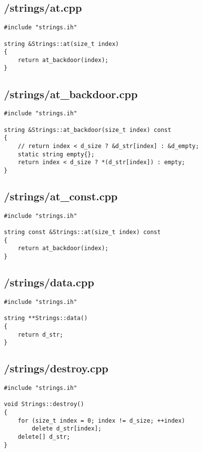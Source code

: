 \documentclass{article}
\begin{document}
\subsection*{/strings/at.cpp}
\begin{verbatim}
#include "strings.ih"

string &Strings::at(size_t index)
{
    return at_backdoor(index);
}
\end{verbatim}
\subsection*{/strings/at\_backdoor.cpp}
\begin{verbatim}
#include "strings.ih"

string &Strings::at_backdoor(size_t index) const
{
    // return index < d_size ? &d_str[index] : &d_empty;
    static string empty{};
    return index < d_size ? *(d_str[index]) : empty; 
}

\end{verbatim}
\subsection*{/strings/at\_const.cpp}
\begin{verbatim}
#include "strings.ih"

string const &Strings::at(size_t index) const
{
    return at_backdoor(index);
}
\end{verbatim}
\subsection*{/strings/data.cpp}
\begin{verbatim}
#include "strings.ih"

string **Strings::data()
{
    return d_str;
}
\end{verbatim}
\subsection*{/strings/destroy.cpp}
\begin{verbatim}
#include "strings.ih"

void Strings::destroy()
{
    for (size_t index = 0; index != d_size; ++index)
        delete d_str[index];
    delete[] d_str;
}
\end{verbatim}
\end{document}
